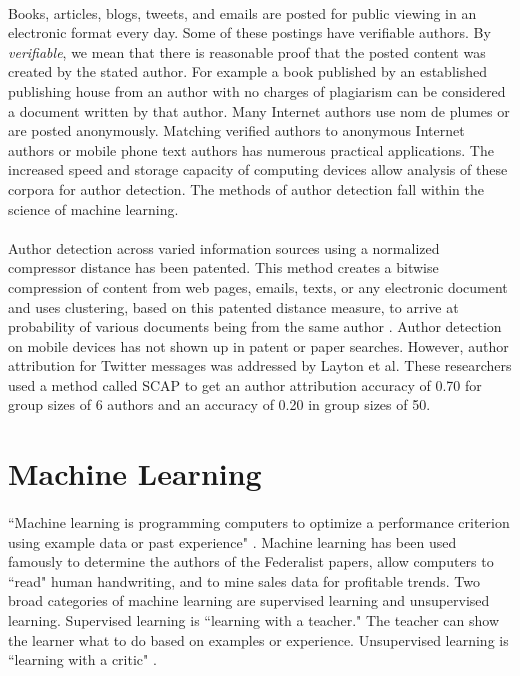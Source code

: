 	\paragraph{} Books, articles, blogs, tweets, and emails are posted for public viewing in an electronic format every day.  Some of these postings have verifiable authors.  By \emph{verifiable}, we mean that there is reasonable proof that the posted content was created by the stated author.  For example a book published by an established publishing house from an author with no charges of plagiarism can be considered a document written by that author. Many Internet authors use nom de plumes or are posted anonymously.  Matching verified authors to anonymous Internet authors or mobile phone text authors has numerous practical applications. The increased speed and storage capacity of computing devices allow analysis of these corpora for author detection. The methods of author detection fall within the science of machine learning.

\paragraph{} Author detection across varied information sources using a normalized compressor distance has been patented.  This method creates a bitwise compression of content from web pages, emails, texts, or any electronic document and uses clustering, based on this patented distance measure, to arrive at probability of various  documents being from the same author \cite{_method_2010}.  Author detection on mobile devices has not shown up in patent or paper searches.  However, author attribution for Twitter messages was addressed by Layton et al. These researchers used a method called SCAP to get an author attribution accuracy of 0.70 for group sizes of 6 authors and an accuracy of 0.20 in group sizes of 50\cite{layton_authorship_2010}.

\section {Machine Learning}
	\paragraph{}``Machine learning is programming computers to optimize a performance criterion using example data or past experience" \cite{alpaydin_introduction_2004}.  Machine learning has been used famously to determine the authors of the Federalist papers, allow computers to ``read" human handwriting, and to mine sales data for profitable trends.  Two broad categories of machine learning are supervised learning and unsupervised learning.  Supervised learning is ``learning with a teacher."  The teacher can show the learner what to do based on examples or experience. Unsupervised learning is ``learning with a critic" \cite{alpaydin_introduction_2004}. 
